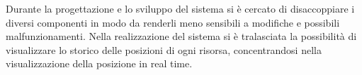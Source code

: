Durante la progettazione e lo sviluppo del sistema si è cercato di disaccoppiare i diversi componenti in modo da renderli meno sensibili a modifiche e possibili malfunzionamenti.
Nella realizzazione del sistema si è tralasciata la possibilità di visualizzare lo storico delle posizioni di ogni risorsa, concentrandosi nella visualizzazione della posizione in real time.
